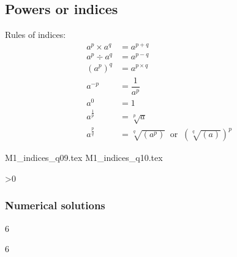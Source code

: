 \subsection{Powers or indices}

Rules of indices:
\begin{align}
	a^{p} \times a^{q} 
		&= a^{p+q}	
		\label{eq:indicesR1} 
		\\
	a^{p} \div a^{q} 
		&= a^{p-q} 		
		\label{eq:indicesR2} 
		\\
	(a^{p})^{q} 
		&= a^{p\times q}		
		\label{eq:indicesR3} 
		\\
	a^{-p} 
		&= \dfrac{1}{a^{p}} 			
		\label{eq:indicesR4} 
		\\
	a^{0} 
		&= 1									
		\label{eq:indicesR5} 
		\\
	a^{\frac{1}{p}} 
		&= \sqrt[p]{a}		
		\label{eq:indicesR6} 
		\\
	a^{\frac{p}{q}} 
		& = \sqrt[q]{(a^{p})} 
		\;\; \text{or} \;\; 
		\left( \sqrt[q]{(a)} \right)^{p}	
		\label{eq:indicesR7}
\end{align}

\begin{questions}



\setcounter{question}{8}
{M1_indices_q09.tex}
\newpage
{M1_indices_q10.tex}

\ifnum\value{printSols}>0
	\subsubsection*{Numerical solutions}
	\setcounter{solNo}{2}
	\begin{enumerate}
		\setcounter{enumi}{8}
	\end{enumerate}
	\else
\fi

\end{questions}